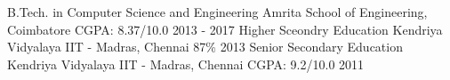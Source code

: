\begin{cventries}
  \cventry
    {B.Tech. in Computer Science and Engineering}
    {Amrita School of Engineering, Coimbatore}
    {CGPA: 8.37/10.0}
    {2013 - 2017}
    {\empty}
  \cventry
    {Higher Sceondry Education}
    {Kendriya Vidyalaya IIT - Madras, Chennai}
    {87\%}
    {2013}
    {\empty}
  \cventry
    {Senior Secondary Education}
    {Kendriya Vidyalaya IIT - Madras, Chennai}
    {CGPA: 9.2/10.0}
    {2011}
    {\empty}
\end{cventries}
